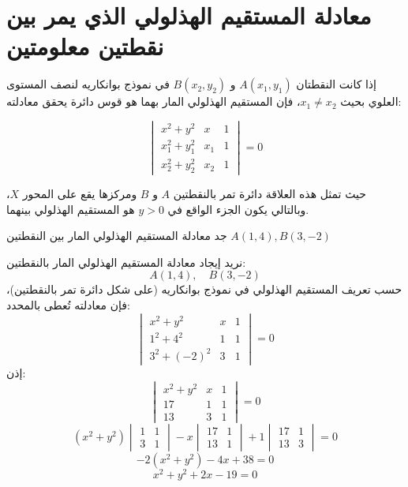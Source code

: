 \section*{معادلة المستقيم الهذلولي الذي يمر بين نقطتين معلومتين}
	إذا كانت النقطتان $A(x_1,y_1)$ و $B(x_2,y_2)$ في نموذج بوانكاريه لنصف المستوى العلوي بحيث $x_1 \neq x_2$، فإن المستقيم الهذلولي المار بهما هو قوس دائرة يحقق معادلته:
	
	\[
	\begin{vmatrix}
		x^2 + y^2 & x & 1 \\
		x_1^2 + y_1^2 & x_1 & 1 \\
		x_2^2 + y_2^2 & x_2 & 1
	\end{vmatrix}
	= 0 \tag{1}
	\]
	
	حيث تمثل هذه العلاقة دائرة تمر بالنقطتين $A$ و $B$ ومركزها يقع على المحور $X$، وبالتالي يكون الجزء الواقع في $y>0$ هو المستقيم الهذلولي بينهما.

\begin{example}
	جد معادلة المستقيم الهذلولي المار بين النقطتين 
	$A( 1, 4 ), B(3, -2)$
\end{example}

\begin{solution}
	نريد إيجاد معادلة المستقيم الهذلولي المار بالنقطتين:
	\[
	A(1,4), \quad B(3,-2)
	\]
	حسب تعريف المستقيم الهذلولي في نموذج بوانكاريه (على شكل دائرة تمر بالنقطتين)، فإن معادلته تُعطى بالمحدد:
	\[
	\begin{vmatrix}
		x^2 + y^2 & x & 1 \\
		1^2 + 4^2 & 1 & 1 \\
		3^2 + (-2)^2 & 3 & 1
	\end{vmatrix}
	= 0
	\]
	إذن:
	\[
	\begin{vmatrix}
		x^2 + y^2 & x & 1 \\
		17 & 1 & 1 \\
		13 & 3 & 1
	\end{vmatrix}
	= 0
	\]
	\[
	(x^2 + y^2)\begin{vmatrix}1 & 1 \\ 3 & 1\end{vmatrix}
	- x \begin{vmatrix}17 & 1 \\ 13 & 1\end{vmatrix}
	+ 1 \begin{vmatrix}17 & 1 \\ 13 & 3\end{vmatrix}
	= 0
	\]
	\[
	-2(x^2 + y^2) - 4x + 38 = 0
	\]
	\[
	x^2 + y^2 + 2x - 19 = 0
	\]
\end{solution}
